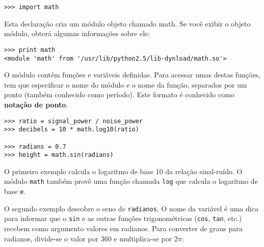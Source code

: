 \beforeverb
\begin{verbatim}
>>> import math
\end{verbatim}
\afterverb
%
%
Esta declaração cria um módulo objeto chamado math. Se você exibir o objeto
módulo, obterá algumas informações sobre ele:

\beforeverb
\begin{verbatim}
>>> print math
<module 'math' from '/usr/lib/python2.5/lib-dynload/math.so'>
\end{verbatim}
\afterverb
%
%
O módulo contém funções e variáveis definidas. Para acessar umas destas
funções, tem que especificar o nome do módulo e o nome da função, separados
por um ponto (também conhecido como período). Este formato é conhecido como
{\bf notação de ponto}.


\beforeverb
\begin{verbatim}
>>> ratio = signal_power / noise_power
>>> decibels = 10 * math.log10(ratio)

>>> radians = 0.7
>>> height = math.sin(radians)
\end{verbatim}
\afterverb
%
%
O primeiro exemplo calcula o logaritmo de base 10 da relação sinal-ruído. O
módulo {\tt math} também provê uma função chamada {\tt log} que calcula o
logaritmo de base {\tt e}.



O segundo exemplo descobre o seno de {\tt radianos}. O nome da variável é uma
dica para informar que o {\tt sin} e as outras funções trigonométricas
({\tt cos}, {\tt tan}, etc.) recebem como argumento valores em radianos. Para
converter de graus para radianos, divide-se o valor por 360 e multiplica-se
por $2 \pi$:


